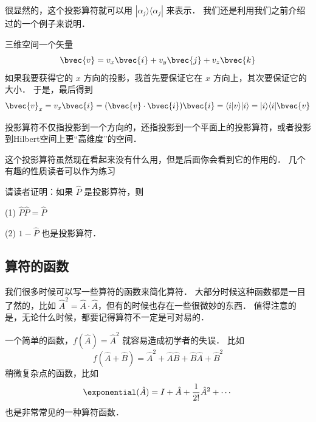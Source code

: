 很显然的，这个投影算符就可以用 $|\alpha_j\rangle\langle\alpha_j|$ 来表示． 我们还是利用我们之前介绍过的一个例子来说明．

\begin{example}{}
三维空间一个矢量
\begin{equation}
\bvec{v} = v_x\bvec{i} + v_y\bvec{j} + v_z \bvec{k}
\end{equation}
如果我要获得它的 $x$ 方向的投影，我首先要保证它在 $x$ 方向上，其次要保证它的大小． 于是，最后得到
\begin{equation}
\bvec{v}_x = v_x\bvec{i} = (\bvec{v}\cdot\bvec{i})\bvec{i} = \langle i|v\rangle |i\rangle = |i\rangle\langle i| \bvec{v}
\end{equation}
\end{example}

投影算符不仅指投影到一个方向的，还指投影到一个平面上的投影算符，或者投影到Hilbert空间上更“高维度”的空间．

这个投影算符虽然现在看起来没有什么用，但是后面你会看到它的作用的． 几个有趣的性质读者可以作为练习

\begin{exercise}{}
请读者证明：如果 $\hat{P}$ 是投影算符，则

(1) $\hat{P}\hat{P} = \hat{P}$

(2) $1-\hat{P}$ 也是投影算符．
\end{exercise}

\subsection{算符的函数}

我们很多时候可以写一些算符的函数来简化算符． 大部分时候这种函数都是一目了然的，比如 $\hat{A}^2 = \hat{A}\cdot\hat{A}$，但有的时候也存在一些很微妙的东西． 值得注意的是，无论什么时候，都要记得算符不一定是可对易的．

一个简单的函数，$f(\hat{A}) = \hat{A}^2$ 就容易造成初学者的失误． 比如
\begin{equation}
f(\hat{A}+\hat{B}) = \hat{A}^2 + \hat{A}\hat{B} + \hat{B}\hat{A} + \hat{B}^2
\end{equation}
稍微复杂点的函数，比如
\begin{equation}
\exponential(\hat{A}) = I + \hat{A} + \frac{1}{2!}\hat{A}^2 + \cdots
\end{equation}
也是非常常见的一种算符函数．

